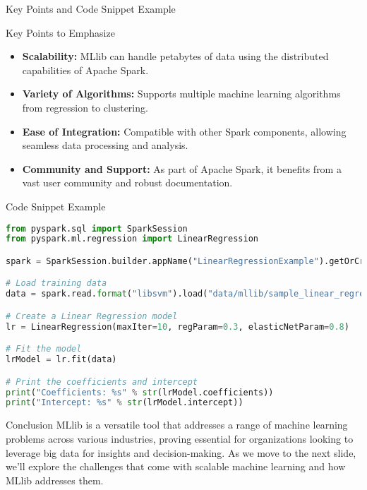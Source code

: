 \documentclass[aspectratio=169]{beamer}
\begin{document}
\begin{frame}[fragile]{Key Points and Code Snippet Example}
    \begin{block}{Key Points to Emphasize}
        \begin{itemize}
            \item \textbf{Scalability:} MLlib can handle petabytes of data using the distributed capabilities of Apache Spark.
            \item \textbf{Variety of Algorithms:} Supports multiple machine learning algorithms from regression to clustering.
            \item \textbf{Ease of Integration:} Compatible with other Spark components, allowing seamless data processing and analysis.
            \item \textbf{Community and Support:} As part of Apache Spark, it benefits from a vast user community and robust documentation.
        \end{itemize}
    \end{block}

    \begin{block}{Code Snippet Example}
        \begin{lstlisting}[language=python]
from pyspark.sql import SparkSession
from pyspark.ml.regression import LinearRegression

spark = SparkSession.builder.appName("LinearRegressionExample").getOrCreate()

# Load training data
data = spark.read.format("libsvm").load("data/mllib/sample_linear_regression_data.txt")

# Create a Linear Regression model
lr = LinearRegression(maxIter=10, regParam=0.3, elasticNetParam=0.8)

# Fit the model
lrModel = lr.fit(data)

# Print the coefficients and intercept
print("Coefficients: %s" % str(lrModel.coefficients))
print("Intercept: %s" % str(lrModel.intercept))
        \end{lstlisting}
    \end{block}
\end{frame}

\begin{frame}[fragile]{Conclusion}
    MLlib is a versatile tool that addresses a range of machine learning problems across various industries, proving essential for organizations looking to leverage big data for insights and decision-making. As we move to the next slide, we'll explore the challenges that come with scalable machine learning and how MLlib addresses them.
\end{frame}
\end{document}
